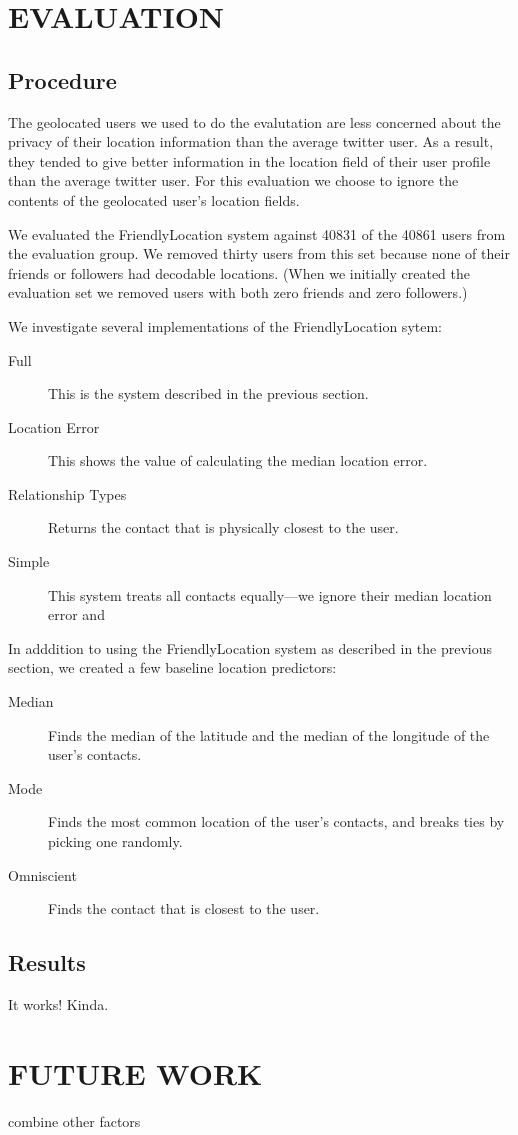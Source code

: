 \documentclass{sig-alternate}
\begin{document}
\section{EVALUATION}
\subsection{Procedure}
The geolocated users we used to do the evalutation are less concerned about the
privacy of their location information than the average twitter user.
As a result, they tended to give better information in the location field of
their user profile than the average twitter user.
For this evaluation we choose to ignore the contents of the geolocated user's
location fields.

We evaluated the FriendlyLocation system against 40831 of the 40861 users from the evaluation group.
We removed thirty users from this set because none of their friends or
followers had decodable locations.
(When we initially created the evaluation
set we removed users with both zero friends and zero followers.)

We investigate several implementations of the FriendlyLocation sytem:
\begin{description}
\item[Full] This is the system described in the previous section.
\item[Location Error] This shows the value of calculating the median location error.
\item[Relationship Types] Returns the contact that is physically closest to the user.
\item[Simple] This system treats all contacts equally---we ignore their median location error and 
\end{description}

In adddition to using the FriendlyLocation system as described in the previous section, we created a few baseline location predictors:
\begin{description}
\item[Median] Finds the median of the latitude and the median of the longitude of the user's contacts.
\item[Mode] Finds the most common location of the user's contacts, and breaks ties by picking one randomly.
\item[Omniscient] Finds the contact that is closest to the user.
\end{description}

\subsection{Results}

It works! Kinda.

\section{FUTURE WORK}
combine other factors


 
\end{document}
